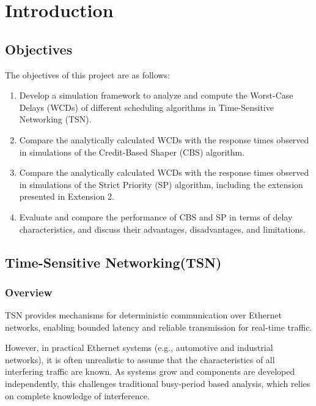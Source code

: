 \section{Introduction}

\subsection{Objectives}

The objectives of this project are as follows:

\begin{enumerate}
\item Develop a simulation framework to analyze and compute the Worst-Case Delays (WCDs) of different scheduling algorithms in Time-Sensitive Networking (TSN).

\item Compare the analytically calculated WCDs with the response times observed in simulations of the Credit-Based Shaper (CBS) algorithm.

\item Compare the analytically calculated WCDs with the response times observed in simulations of the Strict Priority (SP) algorithm, including the extension presented in Extension 2.

\item Evaluate and compare the performance of CBS and SP in terms of delay characteristics, and discuss their advantages, disadvantages, and limitations.
\end{enumerate}

\subsection{Time-Sensitive Networking(TSN)}

\subsubsection{Overview}

TSN provides mechanisms for deterministic communication over Ethernet networks, enabling bounded latency and reliable transmission for real-time traffic.

However, in practical Ethernet systems (e.g., automotive and industrial networks), it is often unrealistic to assume that the characteristics of all interfering traffic are known. As systems grow and components are developed independently, this challenges traditional busy-period based analysis, which relies on complete knowledge of interference.

